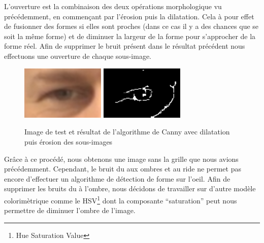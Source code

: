 L'ouverture est la combinaison des deux opérations morphologique vu précédemment, en commençant par 
l'érosion puis la dilatation. Cela à pour effet de fusionner des formes si elles sont proches (dans ce
cas il y a des chances que se soit la même forme) et de diminuer la largeur de la forme pour 
s'approcher de la forme réel. Afin de supprimer le bruit présent dans le résultat précédent nous effectuons une ouverture
de chaque sous-image.

\begin{figure}[H]
 \center
 \includegraphics[width=4cm]{image/original.png}
 \includegraphics[width=4cm]{image/canny_final.png}
 \caption{Image de test et résultat de l'algorithme de Canny avec dilatation puis érosion des sous-images}
\end{figure}

Grâce à ce procédé, nous obtenons une image sans la grille que nous avions précédemment. Cependant,
le bruit du aux ombres et au ride ne permet pas encore d'effectuer un algorithme de détection de forme
sur l'oeil. Afin de supprimer les bruits du à l'ombre, nous décidons de travailler sur d'autre modèle
colorimètrique comme le HSV\footnote{Hue Saturation Value} dont la composante \enquote{saturation} peut nous
permettre de diminuer l'ombre de l'image.




